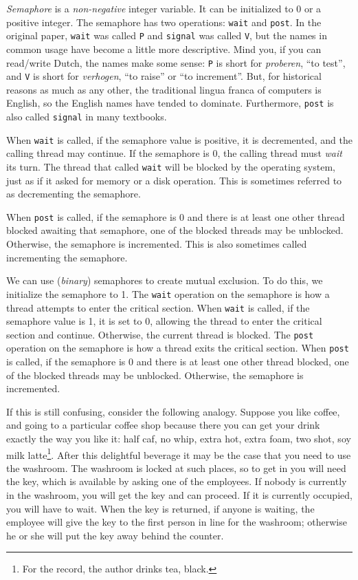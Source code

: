 \textit{Semaphore} is a \emph{non-negative} integer variable. It can be initialized to 0 or a positive integer. The semaphore has two operations: \texttt{wait} and \texttt{post}. In the original paper, \texttt{wait} was called \texttt{P} and \texttt{signal} was called \texttt{V}, but the names in common usage have become a little more descriptive. Mind you, if you can read/write Dutch, the names make some sense: \texttt{P} is short for \textit{proberen}, ``to test'', and \texttt{V} is short for \textit{verhogen}, ``to raise'' or ``to increment''. But, for historical reasons as much as any other, the traditional lingua franca of computers is English, so the English names have tended to dominate. Furthermore, \texttt{post} is also called \texttt{signal} in many textbooks.

When \texttt{wait} is called, if the semaphore value is positive, it is decremented, and the calling thread may continue.
If the semaphore is 0, the calling thread must \textit{wait} its turn.
The thread that called \texttt{wait} will be blocked by the operating system, just as if it asked for memory or a disk operation.
This is sometimes referred to as decrementing the semaphore.

When \texttt{post} is called, if the semaphore is 0 and there is at least one other thread blocked awaiting that semaphore, one of the blocked threads may be unblocked.
Otherwise, the semaphore is incremented.
This is also sometimes called incrementing the semaphore.

We can use (\emph{binary}) semaphores to create mutual exclusion.
To do this, we initialize the semaphore to 1.
The \texttt{wait} operation on the semaphore is how a thread attempts to enter the critical section.
When \texttt{wait} is called, if the semaphore value is 1, it is set to 0, allowing the thread to enter the critical section and continue.
Otherwise, the current thread is blocked.
The \texttt{post} operation on the semaphore is how a thread exits the critical section.
When \texttt{post} is called, if the semaphore is 0 and there is at least one other thread blocked, one of the blocked threads may be unblocked.
Otherwise, the semaphore is incremented.

If this is still confusing, consider the following analogy. Suppose you like coffee, and going to a particular coffee shop because there you can get your drink exactly the way you like it: half caf, no whip, extra hot, extra foam, two shot, soy milk latte\footnote{For the record, the author drinks tea, black.}. After this delightful beverage it may be the case that you need to use the washroom. The washroom is locked at such places, so to get in you will need the key, which is available by asking one of the employees. If nobody is currently in the washroom, you will get the key and can proceed. If it is currently occupied, you will have to wait. When the key is returned, if anyone is waiting, the employee will give the key to the first person in line for the washroom; otherwise he or she will put the key away behind the counter.

